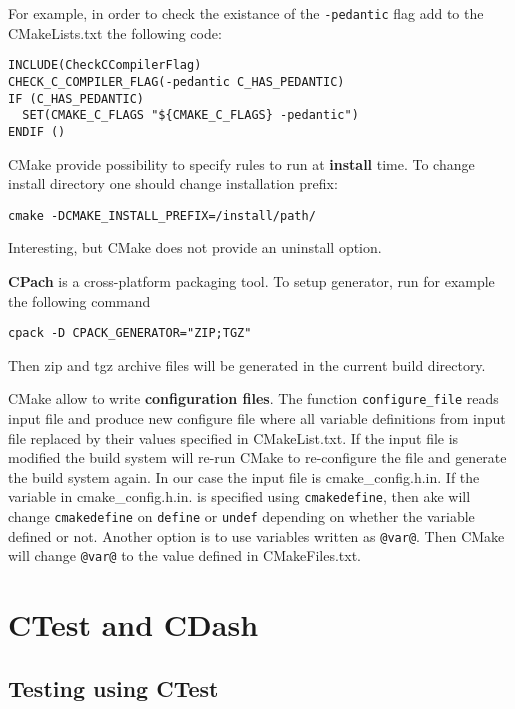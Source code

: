\documentclass[a4paper,10pt]{article}
\begin{document}
For example, in order to check the existance of the \texttt{-pedantic} flag add to the CMakeLists.txt the following code:

\begin{verbatim}
INCLUDE(CheckCCompilerFlag)
CHECK_C_COMPILER_FLAG(-pedantic C_HAS_PEDANTIC)
IF (C_HAS_PEDANTIC)
  SET(CMAKE_C_FLAGS "${CMAKE_C_FLAGS} -pedantic")
ENDIF ()
\end{verbatim}


CMake provide possibility to specify rules to run at \textbf{install} time. 
To change install directory one should change installation prefix:
\begin{verbatim}
cmake -DCMAKE_INSTALL_PREFIX=/install/path/
\end{verbatim}
Interesting, but CMake does not provide an uninstall option. 



\textbf{CPach} is a cross-platform packaging tool. To setup generator, run for example the following command
\begin{verbatim}
cpack -D CPACK_GENERATOR="ZIP;TGZ" 
\end{verbatim}
Then zip and tgz archive files will be generated in the current build directory.



CMake allow to write \textbf{configuration files}. The function \texttt{configure\_file} reads input file and produce new configure file where all variable definitions from input file replaced by their values specified in CMakeList.txt. If the input file is modified the build system will re-run CMake to re-configure the file and generate the build system again. In our case the input file is cmake\_config.h.in.
If the variable in cmake\_config.h.in. is specified using \texttt{cmakedefine}, then ake will change \texttt{cmakedefine} on \texttt{define} or \texttt{undef} depending on whether the variable defined or not. Another option is to use variables written as \texttt{@var@}. Then CMake will change \texttt{@var@} to the value defined in CMakeFiles.txt.




\section{CTest and CDash}

\subsection{Testing using CTest}
\end{document}

